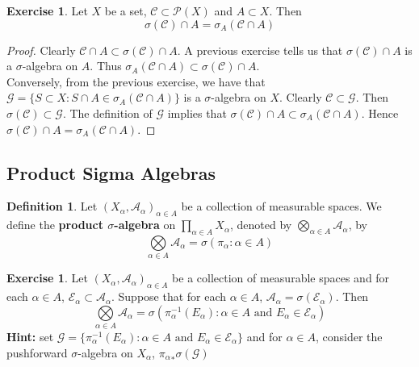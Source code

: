 \documentclass[12pt]{amsart}
\theoremstyle{definition}
\newtheorem{defn}[definition]{Definition}
\newtheorem{ex}[definition]{Exercise}
\newcommand{\al}{\alpha}
\newcommand{\sig}{\sigma}
\newcommand{\MA}{\mathcal{A}}
\newcommand{\MC}{\mathcal{C}}
\newcommand{\MG}{\mathcal{G}}
\newcommand{\MP}{\mathcal{P}}
\newcommand{\ME}{\mathcal{E}}
\newcommand{\lex}[1]{\label{ex:#1}}
\begin{document}
	\begin{ex} \lex{00000} 
		Let $X$ be a set, $\MC \subset \MP(X)$ and $A \subset X$. Then $$\sig(\MC) \cap A = \sig_A(\MC \cap A)$$
	\end{ex}
	
	\begin{proof}
		Clearly $\MC \cap A \subset \sig(\MC) \cap A$. A previous exercise tells us that $\sig(\MC) \cap A$ is a $\sig$-algebra on $A$. Thus $\sig_A(\MC \cap A) \subset \sig(\MC) \cap A$. \vspace{3mm}\\ Conversely, from the previous exercise, we have that $\MG = \{S \subset X: S \cap A \in \sig_A(\MC \cap A)\}$ is a $\sig$-algebra on $X$. Clearly $\MC \subset \MG$. Then $\sig(\MC) \subset \MG$. The definition of $\MG$ implies that $\sig(\MC) \cap A \subset \sig_A(\MC \cap A)$. Hence $\sig(\MC) \cap A = \sig_A(\MC \cap A)$.
	\end{proof}
























	\newpage
	\subsection{Product Sigma Algebras}
	
	\begin{defn}
		Let $(X_{\al}, \MA_{\al})_{\al \in A}$ be a collection of measurable spaces. We define the \textbf{product $\sig$-algebra} on $\prod_{\al \in A}X_{\al}$, denoted by $\bigotimes\limits_{\al \in A} \MA_{\al}$, by $$\bigotimes\limits_{\al \in A} \MA_{\al} = \sig(\pi_{\al}: \al \in A)$$
	\end{defn}

	\begin{ex}
		Let $(X_{\al}, \MA_{\al})_{\al \in A}$ be a collection of measurable spaces and for each $\al \in A$, $\ME_{\al} \subset \MA_{\al}$. Suppose that for each $\al \in A$, $\MA_{\al} = \sig(\ME_{\al})$. Then 
		$$\bigotimes\limits_{\al \in A} \MA_{\al} = \sig( \pi_{\al}^{-1}(E_{\al}): \al \in A \text{ and } E_{\al} \in \ME_{\al})$$ 
		\textbf{Hint:} set $\MG = \{\pi_{\al}^{-1}(E_{\al}): \al \in A \text{ and } E_{\al} \in \ME_{\al}\}$ and for $\al \in A$, consider the pushforward $\sig$-algebra on $X_{\al}$, ${\pi_{\al}}_* \sig( \MG)$
	\end{ex}
\end{document}
